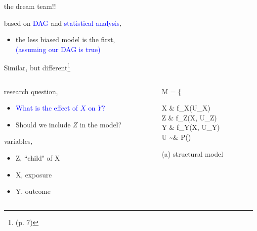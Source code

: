 %
%
\begin{lhframe}[rhgraphic={\texttt{[image: descendant3\_reg1.png]}}]
	{the dream team!!}
	
	based on \textcolor{blue}{DAG} and \textcolor{blue}{statistical analysis},
	\begin{itemize}
		\item the less biased model is the first, \\
		{\small \textcolor{blue}{(assuming our DAG is true)} }
	\end{itemize}
\end{lhframe}
%
%
\begin{frame}
	{Similar, but different\footnote{\citet{Cinelli_et_al_2021} (p. 7)}}
	\begin{columns}
		\begin{column}{0.5\textwidth}
			research question, 
			\begin{itemize}
				\item \textcolor{blue}{What is the effect of $X$ on $Y$?}
				\item Should we include $Z$ in the model?
			\end{itemize}
			
			variables,
			\begin{itemize}
				\item Z, ``child" of X
				\item X, exposure
				\item Y, outcome
			\end{itemize}
		\end{column}
		\begin{column}{0.5\textwidth}  
			\begin{equ}
				M = \left\{ \begin{aligned} 
					X \leftarrow & \; f_{X}(U_{X}) \\
					Z \leftarrow & \; f_{Z}(X, U_{Z}) \\
					Y \leftarrow & \; f_{Y}(X, U_{Y}) \\
					U \sim & \; P()
				\end{aligned} \right
				\caption*{(a) structural model}
			\end{equ}
			\begin{figure}
\end{figure}
\end{column}
\end{columns}
\end{frame}
